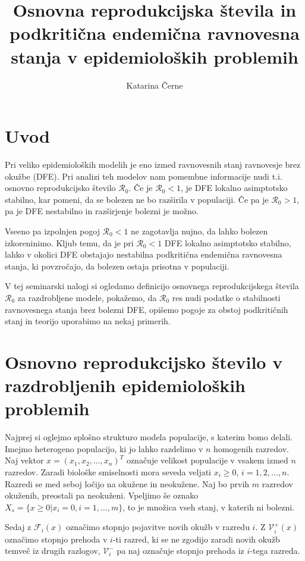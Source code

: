 \documentclass[a4paper,12pt]{article}
\newcommand{\R}{\mathcal R}
\newcommand{\F}{\mathcal F}
\newcommand{\V}{\mathcal V}
\begin{document}
\title{Osnovna reprodukcijska števila in podkritična endemična ravnovesna stanja v epidemioloških problemih}
\author{Katarina Černe}
\maketitle

\section{Uvod}

Pri veliko epidemioloških modelih je eno izmed ravnovesnih stanj ravnovesje brez okužbe (DFE). 
Pri analizi teh modelov nam pomembne informacije nudi t.i. osnovno reprodukcijsko 
število \(\R_0\). Če je \(\R_0<1\), je DFE lokalno asimptotsko stabilno, kar pomeni,
da se bolezen ne bo razširila v populaciji. Če pa je \(\R_0>1\), pa je DFE nestabilno
in razširjenje bolezni je možno.

Vseeno pa izpolnjen pogoj \(\R_0<1\) ne zagotavlja nujno, da lahko bolezen izkoreninimo.
Kljub temu, da je pri \(\R_0<1\) DFE lokalno asimptotsko stabilno, lahko v okolici
DFE obstajajo nestabilna podkritična endemična ravnovesna stanja, ki povzročajo, da 
bolezen ostaja prisotna v populaciji.

V tej seminarski nalogi si ogledamo definicijo osnovnega reprodukcijskega števila 
\(\R_0\) za razdrobljene modele, pokažemo, da \(\R_0\) res nudi podatke o stabilnosti
ravnovesnega stanja brez bolezni DFE, opišemo pogoje za obstoj podkritičnih stanj
in teorijo uporabimo na nekaj primerih.

\section{Osnovno reprodukcijsko število v razdrobljenih epidemioloških problemih} \label{r0}

Najprej si oglejmo splošno strukturo modela populacije, s katerim bomo delali.
Imejmo heterogeno populacijo, ki jo lahko razdelimo v \(n\) homogenih razredov.
Naj vektor \(x=(x_1,x_2,\ldots,x_n)^T\) označuje velikost populacije v vsakem 
izmed \(n\) razredov. Zaradi biološke smiselnosti mora seveda veljati \(x_i\geq 0\),
\(i=1,2,\ldots,n\). Razredi se med seboj ločijo na okužene in neokužene. 
Naj bo prvih \(m\) razredov okuženih, preostali pa neokuženi. Vpeljimo še oznako
\(X_s=\{x\geq 0 | x_i=0, i=1,\ldots, m\}\), to je množica vseh stanj, v katerih
ni bolezni.

Sedaj z \(\F_i(x)\) označimo stopnjo pojavitve novih okužb v razredu \(i\). 
Z \(\V^+_i(x)\) označimo stopnjo prehoda v \(i\)-ti razred, ki se ne zgodijo zaradi 
novih okužb temveč iz drugih razlogov, \(\V^-_i\) pa naj označuje stopnjo prehoda
iz \(i\)-tega razreda. 
\end{document}

